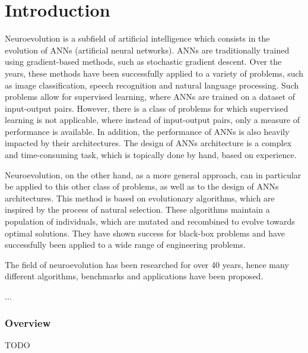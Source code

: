 \chapter{Introduction}

Neuroevolution is a subfield of artificial intelligence which consists in the evolution of ANNs (artificial neural networks).
ANNs are traditionally trained using gradient-based methods, such as stochastic gradient descent.
Over the years, these methods have been successfully applied to a variety of problems, such as image classification, speech recognition and natural language processing.
Such problems allow for supervised learning, where ANNs are trained on a dataset of input-output pairs.
However, there is a class of problems for which supervised learning is not applicable, where instead of input-output pairs, only a measure of performance is available.
In addition, the performance of ANNs is also heavily impacted by their architectures. The design of ANNs architecture is a complex and time-consuming task, which is
topically done by hand, based on experience.

Neuroevolution, on the other hand, as a more general approach, can in particular be applied to this other class of problems, as well as to the design of ANNs architectures.
This method is based on evolutionary algorithms, which are inspired by the process of natural selection. These algorithms maintain a population of individuals,
which are mutated and recombined to evolve towards optimal solutions. They have shown success for black-box problems and have successfully been applied to a wide range
of engineering problems.

The field of neuroevolution has been researched for over 40 years, hence many different algorithms, benchmarks and applications have been proposed.

...

\subsection{Overview}

TODO
